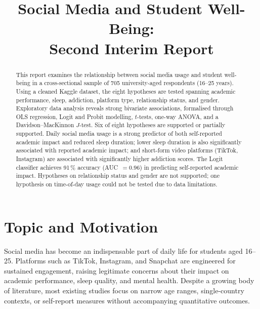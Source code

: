 \documentclass[10pt]{article}
\title{\vspace{-1.2cm}
  \textbf{Social Media and Student Well-Being:\\[2pt]
  Second Interim Report}
  \vspace{-0.4cm}}
\author{}
\date{}
\begin{document}
\maketitle
\thispagestyle{empty}

\begin{abstract}
\noindent
This report examines the relationship between social media usage and student
well-being in a cross-sectional sample of 705 university-aged respondents
(16--25 years). Using a cleaned Kaggle dataset, the eight hypotheses are tested
spanning academic performance, sleep, addiction, platform type, relationship
status, and gender. Exploratory data analysis reveals strong bivariate
associations, formalised through OLS regression, Logit and Probit modelling,
$t$-tests, one-way ANOVA, and a Davidson--MacKinnon
$J$-test. Six of eight hypotheses are supported or partially supported. Daily
social media usage is a strong predictor of both self-reported academic impact
and reduced sleep duration; lower sleep duration is also significantly
associated with reported academic impact; and short-form video platforms
(TikTok, Instagram) are associated with
significantly higher addiction scores. The Logit classifier achieves 91\,\%
accuracy (AUC~$= 0.96$) in predicting self-reported academic impact. Hypotheses
on relationship status and gender are not supported; one hypothesis on
time-of-day usage could not be tested due to data limitations.
\end{abstract}

\section{Topic and Motivation}

Social media has become an indispensable part of daily life for students aged
16--25. Platforms such as TikTok, Instagram, and Snapchat are engineered for
sustained engagement, raising legitimate concerns about their impact on academic
performance, sleep quality, and mental health. Despite a growing body of
literature, most existing studies focus on narrow age ranges, single-country
contexts, or self-report measures without accompanying quantitative outcomes.
\end{document}
